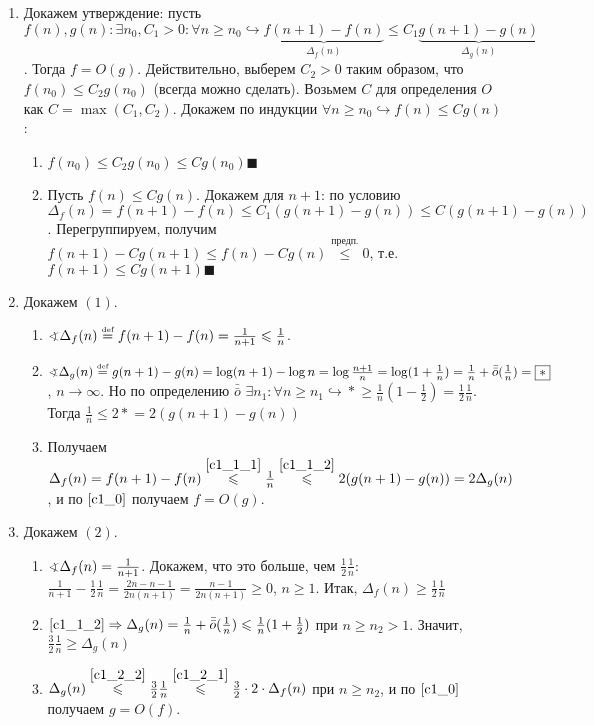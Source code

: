 \documentclass[a4paper]{article}
\def\eqdef{\overset{\mbox{\tiny def}}{=}}
\newcommand{\smallo}{\bar{\bar{o}}}
\begin{document}
\begin{enumerate}
\item \label{c1_0} Докажем утверждение: пусть $f(n),g(n)\colon \exists n_0,C_1>0\colon \forall n\geqslant n_0\hookrightarrow \underbrace{f(n+1)-f(n)}_{\Delta_f(n)}\leqslant C_1\underbrace{g(n+1)-g(n)}_{\Delta_g(n)}$. Тогда $f=O(g)$. Действительно, выберем $C_2>0$ таким образом, что $f(n_0)\leqslant C_2g(n_0)$ (всегда можно сделать). Возьмем $C$ для определения $O$ как $C=\max(C_1,C_2)$. Докажем по индукции $\forall n\geqslant n_0\hookrightarrow f(n)\leqslant Cg(n)$:\begin{enumerate}
\item $f(n_0)\leqslant C_2g(n_0)\leqslant Cg(n_0)\blacksquare$
\item Пусть $f(n)\leqslant Cg(n)$. Докажем для $n+1$: по условию $\Delta_f(n)=f(n+1)-f(n)\leqslant C_1(g(n+1)-g(n))\leqslant C(g(n+1)-g(n))$. Перегруппируем, получим $f(n+1)-Cg(n+1)\leqslant f(n)-Cg(n)\overset{\mbox{предп.}}{\leqslant} 0$, т.е. $f(n+1)\leqslant Cg(n+1)\blacksquare$
\end{enumerate}
\item Докажем $(1)$. \begin{enumerate}
\item \label{c1_1_1} $\varangle \Delta_f(n)\eqdef f(n+1)-f(n)=\frac{1}{n+1}\leqslant \frac{1}{n}$. 
\item \label{c1_1_2} $\varangle \Delta_g(n)\eqdef g(n+1)-g(n)=\log(n+1)-\log n=\log\frac{n+1}{n}=\log(1+\frac{1}{n})=\frac{1}{n}+\smallo(\frac{1}{n})=\boxed{*}$, $n\to\infty$. Но по определению $\smallo$ $\exists n_1\colon\forall n\geqslant n_1\hookrightarrow \boxed{*}\geqslant \frac{1}{n}(1-\frac{1}{2})=\frac{1}{2}\frac{1}{n}$. Тогда $\frac{1}{n}\leqslant 2\boxed{*}=2(g(n+1)-g(n))$
\item Получаем $\Delta_f(n)=f(n+1)-f(n)\overset{\ref{c1_1_1}}{\leqslant} \frac{1}{n}\overset{\ref{c1_1_2}}{\leqslant} 2(g(n+1)-g(n))=2\Delta_g(n)$, и по $\ref{c1_0}$ получаем $f=O(g)$.
\end{enumerate}
\item Докажем $(2)$. \begin{enumerate}
\item \label{c1_2_1} $\varangle \Delta_f(n)=\frac{1}{n+1}$. Докажем, что это больше, чем $\frac{1}{2}\frac{1}{n}$: $\frac{1}{n+1}-\frac{1}{2}\frac{1}{n}=\frac{2n-n-1}{2n(n+1)}=\frac{n-1}{2n(n+1)}\geqslant 0$, $n\geqslant 1$. Итак, $\Delta_f(n)\geqslant \frac{1}{2}\frac{1}{n}$
\item \label{c1_2_2} $\ref{c1_1_2}\Rightarrow \Delta_g(n)=\frac{1}{n}+\smallo(\frac{1}{n})\leqslant \frac{1}{n}(1+\frac{1}{2})$ при $n\geqslant n_2>1$. Значит, $\frac{3}{2}\frac{1}{n}\geqslant\Delta_g(n)$
\item $\Delta_g(n)\overset{\ref{c1_2_2}}{\leqslant}\frac{3}{2}\frac{1}{n}\overset{\ref{c1_2_1}}{\leqslant}\frac{3}{2}\cdot 2\cdot \Delta_f(n)$ при $n\geqslant n_2$, и по $\ref{c1_0}$ получаем $g=O(f)$.
\end{enumerate}
\end{enumerate}
\end{document}
